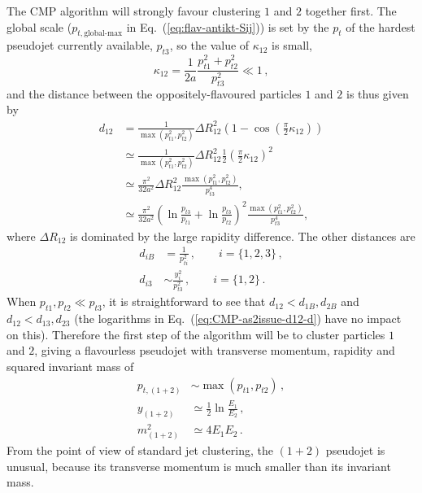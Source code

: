\documentclass[nofootinbib,twocolumn,preprintnumbers,superscriptaddress,aps]{revtex4-2}
\begin{document}
The CMP algorithm will strongly favour clustering $1$ and $2$ together first.
The global scale ($p_{t,\text{global-max}}$ in
Eq.~(\ref{eq:flav-antikt-Sij})) is set by the $p_t$ of the hardest pseudojet currently
available, $p_{t3}$, so the value of $\kappa_{12}$ is small,
%
\begin{equation}
\kappa_{12} = \frac{1}{2a} \frac{p_{t1}^2 + p_{t2}^2}{p_{t3}^2} \ll 1\,,
\end{equation}
%
and the distance between the oppositely-flavoured
particles $1$ and $2$ is thus given by
%
\begin{subequations}
  \begin{align}
    d_{12} &= \frac{1}{\max (p_{t1}^2, p_{t2}^2 )} \Delta R_{12}^2
             \left(1 - \cos \left( \frac{\pi}{2} \kappa_{12} \right) \right)
             \label{eq:CMP-as2issue-d12-a}\\
           &\simeq \frac{1}{\max (p_{t1}^2, p_{t2}^2 )} \Delta R_{12}^2
             \frac{1}{2} \left( \frac{\pi}{2}\kappa_{12} \right)^2\\
           &\simeq \frac{\pi^2}{32 a^2} \Delta R_{12}^2 \frac{\max (p_{t1}^2, p_{t2}^2)}{p_{t3}^4},\\
           &\simeq \frac{\pi^2}{32 a^2} \left(\ln \frac{p_{t3}}{p_{t1}} + \ln  \frac{p_{t3}}{p_{t2}} \right)^2
             \frac{\max (p_{t1}^2, p_{t2}^2)}{p_{t3}^4},
             \label{eq:CMP-as2issue-d12-d}
  \end{align}
\end{subequations}
% 
where $\Delta R_{12}$ is dominated by the large rapidity difference.
%
The other distances are
\begin{subequations}
  \begin{align}
    d_{iB} &= \frac{1}{p_{ti}^2}\,,     \qquad i = \{1,2,3\}\,,
    \\
    d_{i3} &\sim \frac{y_i^2}{p_{t3}^2}\,, \qquad i = \{1,2\}\,.
  \end{align}
\end{subequations}
When $p_{t1}, p_{t2} \ll p_{t3}$, it is straightforward to see that
$d_{12} < d_{1B},d_{2B}$ and $d_{12} < d_{13},d_{23}$ (the logarithms
in Eq.~(\ref{eq:CMP-as2issue-d12-d}) have no impact on this).
%
Therefore the first step of the algorithm will be to cluster particles
$1$ and $2$, giving a flavourless pseudojet with transverse momentum,
rapidity and squared invariant mass of
\begin{subequations}
  \begin{align}
    p_{t,(1+2)} &\sim \max(p_{t1},p_{t2})\,,
    \\
    \label{eq:CMP-y12}
    y_{(1+2)} &\simeq
                \frac{1}{2} \ln \frac{E_1}{E_2}\,,
    \\
    m_{(1+2)}^2 &\simeq 4E_1E_2\,.
  \end{align}
\end{subequations}
From the point of view of standard jet clustering, the $(1+2)$
pseudojet is unusual, because its transverse momentum is much smaller
than its invariant mass.
\end{document}
